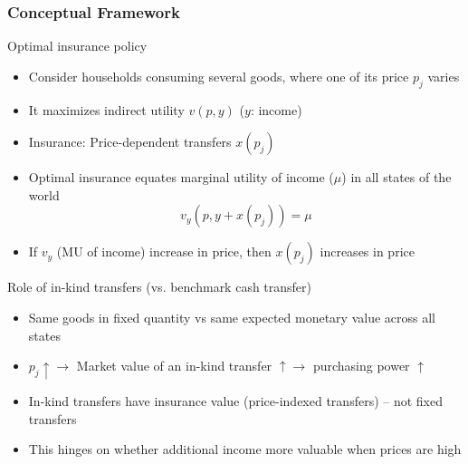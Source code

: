 \documentclass[aspectratio=169]{beamer}
\begin{document}
\begin{frame}
\frametitle{Conceptual Framework} 
Optimal insurance policy
\begin{itemize}\setlength\itemsep{3pt}
\item Consider households consuming several goods, where one of its price $p_j$ varies 
\item It maximizes indirect utility $v(p, y)$ ($y$: income)
\item Insurance: Price-dependent transfers $x(p_j)$
\item Optimal insurance equates marginal utility of income ($\mu$) in all states of the world
\[
v_y(p, y+x(p_j)) = \mu
\]\vspace{-20pt}
\item If $v_y$ (MU of income) increase in price, then $x(p_j)$ increases in price
\end{itemize}\medskip
Role of in-kind transfers (vs. benchmark cash transfer)
\begin{itemize}\setlength\itemsep{3pt}
\item Same goods in fixed quantity vs same expected monetary value across all states
\item $p_j\uparrow\to$ Market value of an in-kind transfer $\uparrow\to$  purchasing power $\uparrow$ 
\item In-kind transfers have insurance value (price-indexed transfers) -- not fixed transfers
\item This hinges on whether additional income more valuable when prices are high

\end{itemize}\medskip
\end{frame}
\end{document}
